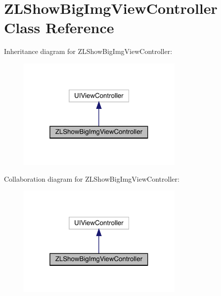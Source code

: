 \hypertarget{interface_z_l_show_big_img_view_controller}{}\section{Z\+L\+Show\+Big\+Img\+View\+Controller Class Reference}
\label{interface_z_l_show_big_img_view_controller}


Inheritance diagram for Z\+L\+Show\+Big\+Img\+View\+Controller\+:\nopagebreak
\begin{figure}[H]
\begin{center}
\leavevmode
\includegraphics[width=229pt]{interface_z_l_show_big_img_view_controller__inherit__graph}
\end{center}
\end{figure}


Collaboration diagram for Z\+L\+Show\+Big\+Img\+View\+Controller\+:\nopagebreak
\begin{figure}[H]
\begin{center}
\leavevmode
\includegraphics[width=229pt]{interface_z_l_show_big_img_view_controller__coll__graph}
\end{center}
\end{figure}
